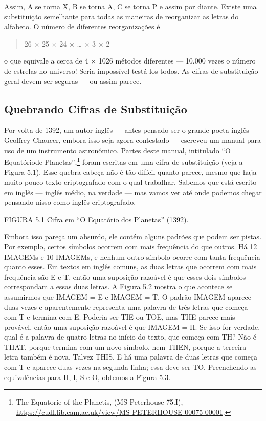\documentclass{book}
\begin{document}
Assim, A se torna X, B se torna A, C se torna P e assim por diante. Existe uma substituição semelhante para todas as maneiras de reorganizar as letras do alfabeto. O número de diferentes reorganizações é
\begin{quote}
    26 × 25 × 24 × … × 3 × 2
\end{quote}

o que equivale a cerca de 4 × 1026 métodos diferentes --- 10.000 vezes o número de estrelas no universo! Seria impossível testá-los todos. As cifras de substituição geral devem ser seguras --- ou assim parece.


\subsection{Quebrando Cifras de Substituição}
\label{segredos:cifras}

Por volta de 1392, um autor inglês --- antes pensado ser o grande poeta inglês Geoffrey Chaucer, embora isso seja agora contestado --- escreveu um manual para uso de um instrumento astronômico. Partes deste manual, intitulado ``O Equatóriode Planetas'',\footnote{The Equatorie of the Planetis, (MS Peterhouse 75.I), \url{https://cudl.lib.cam.ac.uk/view/MS-PETERHOUSE-00075-00001}.} foram escritas em uma cifra de substituição (veja a Figura 5.1). Esse quebra-cabeça não é tão difícil quanto parece, mesmo que haja muito pouco texto criptografado com o qual trabalhar. Sabemos que está escrito em inglês --- inglês médio, na verdade --- mas vamos ver até onde podemos chegar pensando nisso como inglês criptografado.

FIGURA 5.1 Cifra em ``O Equatório dos Planetas'' (1392).

Embora isso pareça um absurdo, ele contém alguns padrões que podem ser pistas. Por exemplo, certos símbolos ocorrem com mais frequência do que outros. Há 12 IMAGEMs e 10 IMAGEMs, e nenhum outro símbolo ocorre com tanta frequência quanto esses. Em textos em inglês comuns, as duas letras que ocorrem com mais frequência são E e T, então uma suposição razoável é que esses dois símbolos correspondam a essas duas letras. A Figura 5.2 mostra o que acontece se assumirmos que IMAGEM = E e IMAGEM = T. O padrão IMAGEM aparece duas vezes e aparentemente representa uma palavra de três letras que começa com T e termina com E. Poderia ser TIE ou TOE, mas THE parece mais provável, então uma suposição razoável é que IMAGEM = H. Se isso for verdade, qual é a palavra de quatro letras no início do texto, que começa com TH? Não é THAT, porque termina com um novo símbolo, nem THEN, porque a terceira letra também é nova. Talvez THIS. E há uma palavra de duas letras que começa com T e aparece duas vezes na segunda linha; essa deve ser TO. Preenchendo as equivalências para H, I, S e O, obtemos a Figura 5.3.
\end{document}
